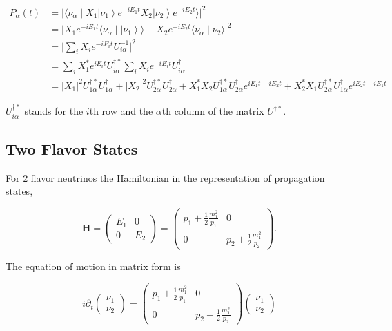 \documentclass{tufte-handout}
\newcommand{\ket}[1]{\left| #1\right\rangle}
\newcommand{\braket}[2]{\langle #1 \mid #2 \rangle}
\begin{document}
\begin{align*}
P_\alpha (t) &= \lvert \braket{\nu_\alpha}{ X_1 \ket{\nu_1 } e^{-i E_1 t} X_2 \ket{ \nu_2 } e^{-i E_2 t} }  \rvert^2 \\
& = \lvert  X_1 e^{-i E_1 t} \braket{\nu_\alpha}{\ket{\nu_1} } + X_2 e^{-i E_2 t} \braket{ \nu_\alpha }{ \nu_2 } \rvert^2 \\
& = \lvert \sum_i X_i e^{-i E_i t} U^{-1}_{i \alpha}  \rvert ^2 \\
& = \sum_i X_1^* e^{iE_i t} U^{\dagger *}_{i\alpha} \sum_i X_i e^{-i E_i t} U^\dagger_{i \alpha} \\
& = \lvert X_1 \rvert^2 U^{\dagger *}_{1\alpha} U^\dagger_{1\alpha} + \lvert X_2 \rvert^2 U^{\dagger *}_{2\alpha} U^\dagger_{2\alpha}  + X_1^* X_2 U^{\dagger *}_{1\alpha} U^\dagger_{2\alpha} e^{i E_1 t - i E_2 t} + X_2^* X_1 U^{\dagger *}_{2\alpha} U^\dagger_{1\alpha} e^{i E_2 t - i E_1 t}
\end{align*}


$U^{\dagger *}_{i\alpha}$ stands for the $i$th row and the $\alpha$th column of the matrix $U^{\dagger *}$. 



\subsection{Two Flavor States}


For 2 flavor neutrinos the Hamiltonian in the representation of propagation states,

\begin{equation*}
\mathbf H  = \begin{pmatrix}
E_1 & 0 \\
0 & E_2
\end{pmatrix} 
 = \begin{pmatrix}
p_1 + \frac{1}{2}\frac{m_1^2}{p_1} & 0 \\
0 & p_2 + \frac{1}{2}\frac{m_1^2}{p_2}
\end{pmatrix}.
\end{equation*}

The equation of motion in matrix form is

\begin{equation}
i\partial_t \begin{pmatrix}
\nu_1 \\ \nu_2 \end{pmatrix} = \begin{pmatrix}
p_1 + \frac{1}{2}\frac{m_1^2}{p_1} & 0 \\
0 & p_2 + \frac{1}{2}\frac{m_1^2}{p_2}
\end{pmatrix} \begin{pmatrix}
\nu_1 \\ \nu_2 \end{pmatrix} 
\end{equation}
\end{document}
